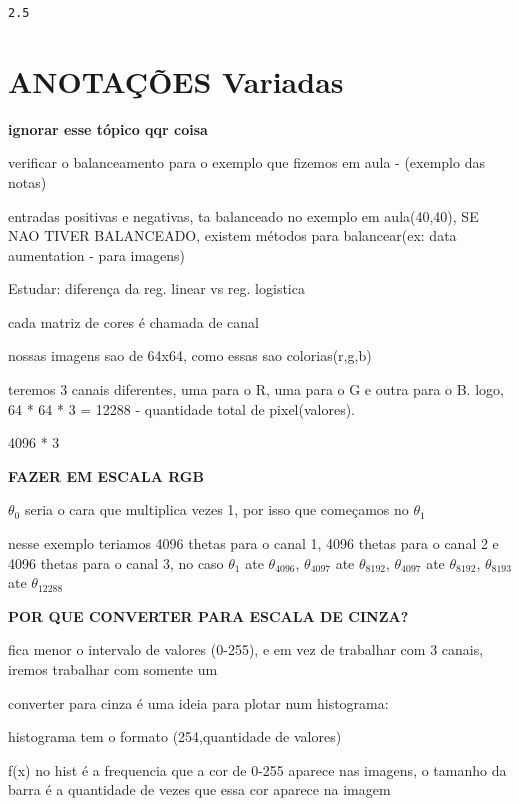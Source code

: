\documentclass[12pt]{article}
\newcommand{\prompt}[4]{
        \llap{{\color{#2}[#3]: #4}}\vspace{-1.25em}
    }
\begin{document}
            \begin{tcolorbox}[breakable, boxrule=.5pt, size=fbox, pad at break*=1mm, opacityfill=0]
\prompt{Out}{outcolor}{6}{\hspace{3.5pt}}
\begin{Verbatim}[commandchars=\\\{\}]
2.5
\end{Verbatim}
\end{tcolorbox}
        
    \hypertarget{anotauxe7uxf5es-variadas}{%
\section{ANOTAÇÕES Variadas}\label{anotauxe7uxf5es-variadas}}

\textbf{ignorar esse tópico qqr coisa}

verificar o balanceamento para o exemplo que fizemos em aula - (exemplo
das notas)

entradas positivas e negativas, ta balanceado no exemplo em aula(40,40),
SE NAO TIVER BALANCEADO, existem métodos para balancear(ex: data
aumentation - para imagens)

Estudar: diferença da reg. linear vs reg. logistica

cada matriz de cores é chamada de canal

nossas imagens sao de 64x64, como essas sao colorias(r,g,b)

teremos 3 canais diferentes, uma para o R, uma para o G e outra para o
B. logo, 64 * 64 * 3 = 12288 - quantidade total de pixel(valores).

4096 * 3

\textbf{FAZER EM ESCALA RGB}

\(\theta_0\) seria o cara que multiplica vezes 1, por isso que começamos
no \(\theta_1\)

nesse exemplo teriamos 4096 thetas para o canal 1, 4096 thetas para o
canal 2 e 4096 thetas para o canal 3, no caso \(\theta_1\) ate
\(\theta_{4096}\), \(\theta_{4097}\) ate \(\theta_{8192}\),
\(\theta_{4097}\) ate \(\theta_{8192}\), \(\theta_{8193}\) ate
\(\theta_{12288}\)

\textbf{POR QUE CONVERTER PARA ESCALA DE CINZA?}

fica menor o intervalo de valores (0-255), e em vez de trabalhar com 3
canais, iremos trabalhar com somente um

converter para cinza é uma ideia para plotar num histograma:

histograma tem o formato (254,quantidade de valores)

f(x) no hist é a frequencia que a cor de 0-255 aparece nas imagens, o
tamanho da barra é a quantidade de vezes que essa cor aparece na imagem


    
    
    
    
\end{document}
